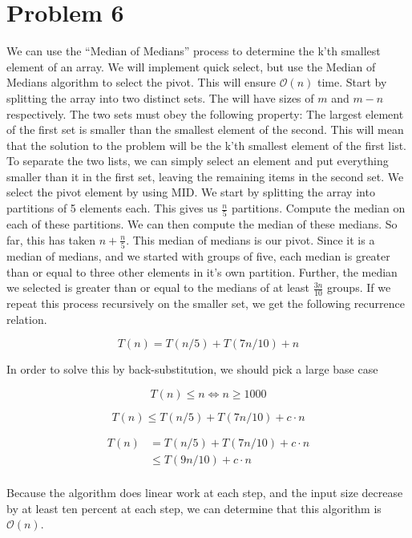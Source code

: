 \documentclass{article}
\newenvironment{problem}[1]{
  \nobreak\section*{Problem #1}
}{}
\newcommand*{\bigO}[1]{\ensuremath{\mathcal{O}\left(#1\right)}}
\begin{document}
  \begin{problem}{6}
    We can use the ``Median of Medians'' process to determine the 
    k'th smallest element of an array.  We will implement quick select,
    but use the Median of Medians algorithm to select the pivot. This will
    ensure \bigO{n} time.  Start by splitting the array into two distinct sets.
    The will have sizes of $m$ and $m - n$ respectively.  The two sets must obey the
    following property: The largest element of the first set is smaller than the 
    smallest element of the second.  This will mean that the solution to the
    problem will be the k'th smallest element of the first list.  To separate
    the two lists, we can simply select an element and put everything smaller than it
    in the first set, leaving the remaining items in the second set.  We select
    the pivot element by using MID.  We start by splitting the array into partitions
    of 5 elements each.  This gives us $\frac{n}{5}$ partitions.  Compute the median
    on each of these partitions.  We can then compute the median of these medians.
    So far, this has taken $n + \frac{n}{5}$.  This median of medians is our pivot.
    Since it is a median of medians, and we started with groups of five, each
    median is greater than or equal to three other elements in it's own partition.  Further,
    the median we selected is greater than or equal to the medians of at least
    $\frac{3n}{10}$ groups.  If we repeat this process recursively on the smaller
    set, we get the following recurrence relation.

    \begin{displaymath}
      T(n) = T(n / 5) + T(7n / 10) + n
    \end{displaymath}

    In order to solve this by back-substitution, we should pick a large base case

    \begin{displaymath}
      T(n) \le n \iff n \ge 1000
    \end{displaymath}

    \begin{displaymath}
      T(n) \le T(n / 5) + T(7n / 10) + c \cdot n
    \end{displaymath}

    \begin{equation*}
      \begin{split}
        T(n) & = T(n / 5) + T(7n / 10) + c \cdot n \\
        & \le T(9n / 10) + c \cdot n \\
      \end{split}
    \end{equation*}

    Because the algorithm does linear work at each step, and the input size
    decrease by at least ten percent at each step, we can determine that this
    algorithm is \bigO{n}.
  \end{problem}
\end{document}
